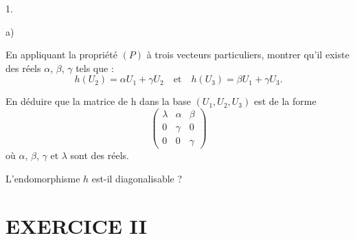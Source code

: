 \documentclass[11pt]{article}%
\begin{document}
\begin{noliste}{1.}
\begin{noliste}{a)}
 \setlength{\itemsep}{2mm}
\item En appliquant la propriété $(P)$ à trois vecteurs particuliers,
montrer qu'il existe des réels $\alpha $, $\beta $, $\gamma $ tels que
:
\[
h(U_{2}) = \alpha U_{1} + \gamma U_{2}\quad \text{et}\quad h(U_{3}) =
\beta
U_{1} + \gamma U_{3}.
\]

\item En déduire que la matrice de h dans la base $(U_{1},U_{2},U_{3})$
est
de la forme
\[
\left( 
\begin{array}{ccc}
\lambda & \alpha & \beta \\
0 & \gamma & 0 \\
0 & 0 & \gamma 
\end{array}
\right) 
\]
où $\alpha $, $\beta $, $\gamma $ et $\lambda $ sont des réels.

\item L'endomorphisme $h$ est-il diagonalisable ?
\end{noliste}
\end{noliste}

\section*{EXERCICE II}
\end{document}
